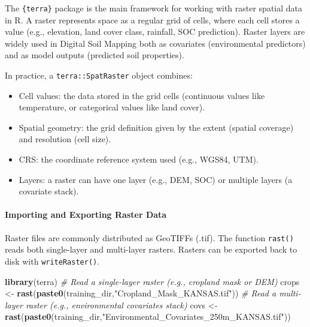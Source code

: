 \documentclass[
  10pt,
  b5paper,
  oneside]{book}
\newenvironment{Shaded}{\begin{snugshade}}{\end{snugshade}}
\newcommand{\CommentTok}[1]{\textcolor[rgb]{0.56,0.35,0.01}{\textit{#1}}}
\newcommand{\FunctionTok}[1]{\textcolor[rgb]{0.13,0.29,0.53}{\textbf{#1}}}
\newcommand{\NormalTok}[1]{#1}
\newcommand{\OtherTok}[1]{\textcolor[rgb]{0.56,0.35,0.01}{#1}}
\newcommand{\StringTok}[1]{\textcolor[rgb]{0.31,0.60,0.02}{#1}}
\begin{document}
The \texttt{\{terra\}} package is the main framework for working with raster spatial data in R. A raster represents space as a regular grid of cells, where each cell stores a value (e.g., elevation, land cover class, rainfall, SOC prediction). Raster layers are widely used in Digital Soil Mapping both as covariates (environmental predictors) and as model outputs (predicted soil properties).

In practice, a \texttt{terra::SpatRaster} object combines:

\begin{itemize}
\item
  Cell values: the data stored in the grid cells (continuous values like temperature, or categorical values like land cover).
\item
  Spatial geometry: the grid definition given by the extent (spatial coverage) and resolution (cell size).
\item
  CRS: the coordinate reference system used (e.g., WGS84, UTM).
\item
  Layers: a raster can have one layer (e.g., DEM, SOC) or multiple layers (a covariate stack).
\end{itemize}

\paragraph*{Importing and Exporting Raster Data}\label{importing-and-exporting-raster-data}

Raster files are commonly distributed as GeoTIFFs (.tif). The function \texttt{rast()} reads both single-layer and multi-layer rasters. Rasters can be exported back to disk with \texttt{writeRaster()}.

\begin{Shaded}
\begin{Highlighting}[]
\FunctionTok{library}\NormalTok{(terra)}
\CommentTok{\# Read a single{-}layer raster (e.g., cropland mask or DEM)}
\NormalTok{crops }\OtherTok{\textless{}{-}} \FunctionTok{rast}\NormalTok{(}\FunctionTok{paste0}\NormalTok{(training\_dir,}\StringTok{"Cropland\_Mask\_KANSAS.tif"}\NormalTok{))}
\CommentTok{\# Read a multi{-}layer raster (e.g., environmental covariates stack)}
\NormalTok{covs }\OtherTok{\textless{}{-}} \FunctionTok{rast}\NormalTok{(}\FunctionTok{paste0}\NormalTok{(training\_dir,}\StringTok{"Environmental\_Covariates\_250m\_KANSAS.tif"}\NormalTok{))}
\end{Highlighting}
\end{Shaded}
\end{document}
